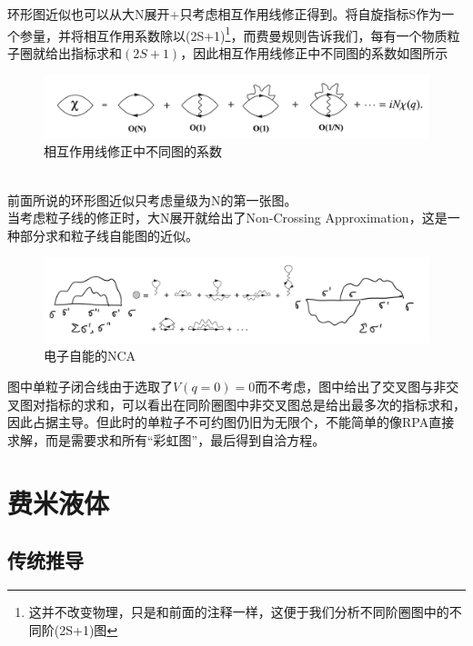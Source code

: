\documentclass[10pt,openany]{book}
\theoremstyle{thmstyle} %
\theoremstyle{defstyle} %
\theoremstyle{prostyle} %
\begin{document}
环形图近似也可以从大N展开+只考虑相互作用线修正得到。将自旋指标S作为一个参量，并将相互作用系数除以(2S+1)\footnote{这并不改变物理，只是和前面的注释一样，这便于我们分析不同阶圈图中的不同阶(2S+1)图}，而费曼规则告诉我们，每有一个物质粒子圈就给出指标求和$ (2S+1) $，因此相互作用线修正中不同图的系数如图所示
\begin{figure}[htbp]
  \centering
  \includegraphics*[scale=0.5]{Figures/大N展开.png}
  \caption{相互作用线修正中不同图的系数}
\end{figure}
\\ 
前面所说的环形图近似只考虑量级为N的第一张图。\\

当考虑粒子线的修正时，大N展开就给出了Non-Crossing Approximation，这是一种部分求和粒子线自能图的近似。
\begin{figure}[htbp]
  \centering
  \includegraphics*[scale=0.5]{Figures/电子自能的NCA.png}
  \caption{电子自能的NCA}
\end{figure}
图中单粒子闭合线由于选取了$ V(q=0)=0 $而不考虑，图中给出了交叉图与非交叉图对指标的求和，可以看出在同阶圈图中非交叉图总是给出最多次的指标求和，因此占据主导。但此时的单粒子不可约图仍旧为无限个，不能简单的像RPA直接求解，而是需要求和所有“彩虹图”，最后得到自洽方程。 
\section{费米液体}
\subsection{传统推导}
\end{document}

